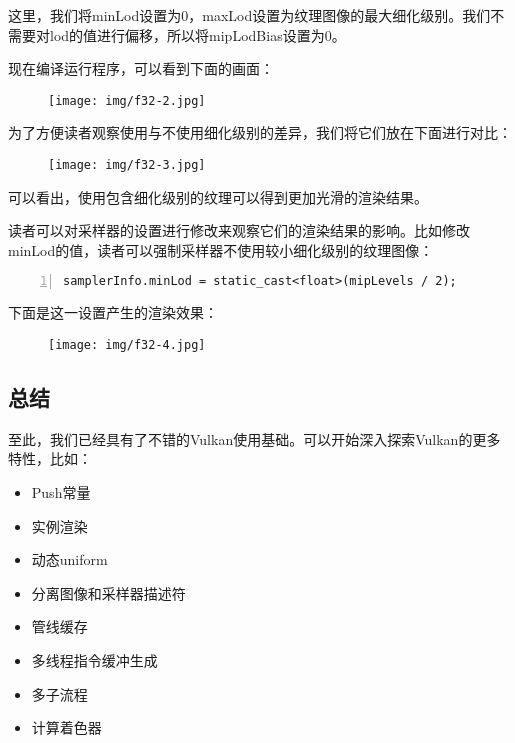 \documentclass{ctexart}
\begin{document}
这里，我们将minLod设置为0，maxLod设置为纹理图像的最大细化级别。我们不需要对lod的值进行偏移，所以将mipLodBias设置为0。

现在编译运行程序，可以看到下面的画面：

\begin{figure}[H]
	\centering
	\texttt{[image: img/f32-2.jpg]}
\end{figure}

为了方便读者观察使用与不使用细化级别的差异，我们将它们放在下面进行对比：

\begin{figure}[H]
	\centering
	\texttt{[image: img/f32-3.jpg]}
\end{figure}

可以看出，使用包含细化级别的纹理可以得到更加光滑的渲染结果。

读者可以对采样器的设置进行修改来观察它们的渲染结果的影响。比如修改minLod的值，读者可以强制采样器不使用较小细化级别的纹理图像：

\begin{lstlisting}[language={[ANSI]C},keywordstyle=\color{blue!70},commentstyle=\color{red!50!green!50!blue!50},frame=shadowbox, rulesepcolor=\color{red!20!green!20!blue!20},basicstyle=\small,numbers=left, numberstyle=\tiny,breaklines=true]
samplerInfo.minLod = static_cast<float>(mipLevels / 2);
\end{lstlisting}

下面是这一设置产生的渲染效果：

\begin{figure}[H]
	\centering
	\texttt{[image: img/f32-4.jpg]}
\end{figure}

\subsection{总结}

至此，我们已经具有了不错的Vulkan使用基础。可以开始深入探索Vulkan的更多特性，比如：

\begin{itemize}
	\item Push常量
	\item 实例渲染
	\item 动态uniform
	\item 分离图像和采样器描述符
	\item 管线缓存
	\item 多线程指令缓冲生成
	\item 多子流程
	\item 计算着色器
\end{itemize}
\end{document}
